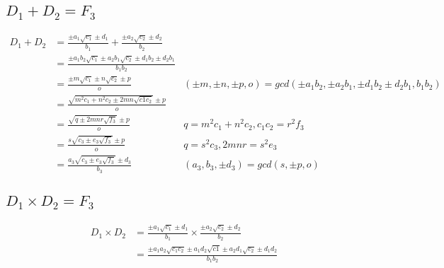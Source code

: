 \documentclass{article}
\begin{document}
\subsection{$D_1 + D_2 = F_3$}
\begin{align*}
D_1 + D_2 &= \frac{\pm a_1\sqrt{c_1} \pm d_1 }{b_1} + \frac{\pm a_2\sqrt{c_2} \pm d_2 }{b_2}\\
 &= \frac{\pm a_1b_2\sqrt{c_1} \pm a_2b_1\sqrt{c_2} \pm d_1b_2 \pm d_2b_1}{b_1b_2} \\
 &= \frac{\pm m\sqrt{c_1} \pm n\sqrt{c_2} \pm p }{o}
     & (\pm m, \pm n, \pm p, o) = gcd(\pm a_1b_2, \pm a_2b_1, \pm d_1b_2 \pm d_2b_1, b_1b_2)\\
 &= \frac{\sqrt{m^2c_1 + n^2c_2 \pm 2mn\sqrt{c1c_2}} \pm p }{o} \\
 &= \frac{\sqrt{q \pm 2mnr\sqrt{f_3}} \pm p}{o}     & q = m^2c_1 + n^2c_2, c_1c_2 = r^2f_3\\
 &= \frac{s\sqrt{c_3 \pm e_3\sqrt{f_3}} \pm p}{o}   & q = s^2c_3, 2mnr = s^2e_3 \\
 &= \frac{a_3\sqrt{c_3 \pm e_3\sqrt{f_3}} \pm d_3}{b_3}
    & (a_3, b_3, \pm d_3) = gcd(s, \pm p, o)
\end{align*}

\subsection{$D_1 \times D_2 = F_3$}
\begin{align*}
D_1 \times D_2 &= \frac{\pm a_1\sqrt{c_1} \pm d_1 }{b_1} \times \frac{\pm a_2\sqrt{c_2} \pm d_2 }{b_2}\\
 &= \frac{\pm a_1a_2\sqrt{c_1c_2} \pm a_1d_2\sqrt{c1} \pm a_2d_1\sqrt{c_2} \pm d_1d_2}{b_1b_2}\\
\end{align*}
\end{document}
